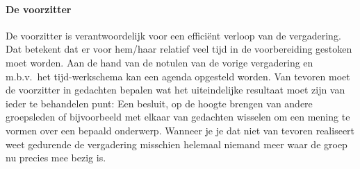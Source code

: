\paragraph{De voorzitter} 
De voorzitter is verantwoordelijk voor een effici\"ent verloop
van de vergadering. Dat betekent dat er voor hem/haar relatief
veel tijd in de voorbereiding gestoken moet worden. Aan de
hand van de notulen van de vorige vergadering en m.b.v.\ het
tijd-werkschema kan een agenda opgesteld worden. Van tevoren
moet de voorzitter in gedachten bepalen wat het uiteindelijke
resultaat moet zijn van ieder te behandelen punt: Een besluit,
op de hoogte brengen van andere groepsleden of bijvoorbeeld
met elkaar van gedachten wisselen om een mening te vormen over
een bepaald onderwerp. Wanneer je je dat niet van tevoren
realiseert weet gedurende de vergadering misschien helemaal
niemand meer waar de groep nu precies mee bezig is.

